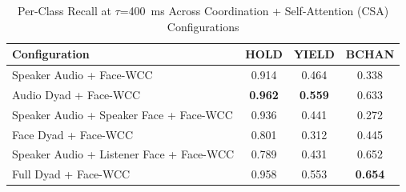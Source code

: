 \begin{table}[h]
\caption{Per-Class Recall at $\tau$=400~ms Across Coordination + Self-Attention (CSA) Configurations}
\label{tab:recall_per_class_csa}
\small
\renewcommand{\arraystretch}{1.20}
\begin{tabular}{>{\raggedright\arraybackslash}p{4cm}ccc}
\toprule
Configuration & HOLD & YIELD & BCHAN \\
\midrule
Speaker Audio + Face-WCC & 0.914 & 0.464 & 0.338 \\
Audio Dyad + Face-WCC & \textbf{0.962} & \textbf{0.559} & 0.633 \\
Speaker Audio + Speaker Face + Face-WCC & 0.936 & 0.441 & 0.272 \\
Face Dyad + Face-WCC & 0.801 & 0.312 & 0.445 \\
Speaker Audio + Listener Face + Face-WCC & 0.789 & 0.431 & 0.652 \\
Full Dyad + Face-WCC & 0.958 & 0.553 & \textbf{0.654} \\
\bottomrule
\end{tabular}
\end{table}
